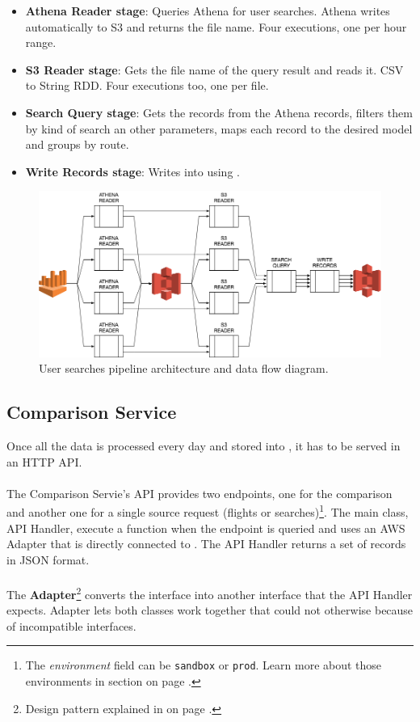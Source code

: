 \begin{itemize}
    \item \textbf{Athena Reader stage}: Queries Athena for user searches. Athena writes automatically to S3 and returns the file name. Four executions, one per hour range.
    \item \textbf{S3 Reader stage}: Gets the file name of the query result and reads it. CSV\cite{csv} to String RDD. Four executions too, one per file.
    \item \textbf{Search Query stage}: Gets the records from the Athena records, filters them by kind of search an other parameters, maps each record to the desired model and groups by route.
    \item \textbf{Write Records stage}: Writes into  using .
\end{itemize}

\begin{figure}[H]
\centering
\includegraphics[scale=0.45]{diagrams/user-searches-pipeline-architecture.png}
\caption{User searches pipeline architecture and data flow diagram.}
\end{figure}


\subsection{Comparison Service} \label{comparison_service}

Once all the data is processed every day and stored into , it has to be served in an HTTP\cite{http} API.
\\\\
The Comparison Servie's API provides two endpoints, one for the comparison and another one for a single source request (flights or searches)\footnote{The \textit{environment} field can be \texttt{sandbox} or \texttt{prod}. Learn more about those environments in section  on page \pageref{environments}.}. The main class, API Handler, execute a function when the endpoint is queried and uses an AWS Adapter that is directly connected to . The API Handler returns a set of records in JSON format.
\\\\
The \textbf{Adapter}\footnote{Design pattern explained in  on page \pageref{appendix_b}.} converts the  interface into another interface that the API Handler expects. Adapter lets both classes work together that could not otherwise because of incompatible interfaces.

